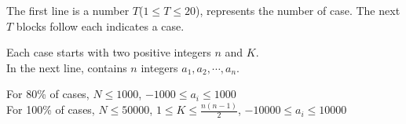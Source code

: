 The first line is a number $T$($1 \leq T \leq 20$), represents the number of case. The next $T$ blocks follow each indicates a case.

Each case starts with two positive integers $n$ and $K$.\\
In the next line, contains $n$ integers $a_{1},a_{2}, \cdots , a_{n}$.

For 80\% of cases, $N \leq 1000$, $-1000 \leq a_{i} \leq 1000$\\
For 100\% of cases, $N \leq 50000$, $1 \leq K \leq \frac{n(n-1)}{2}$, $-10000 \leq a_{i} \leq 10000$